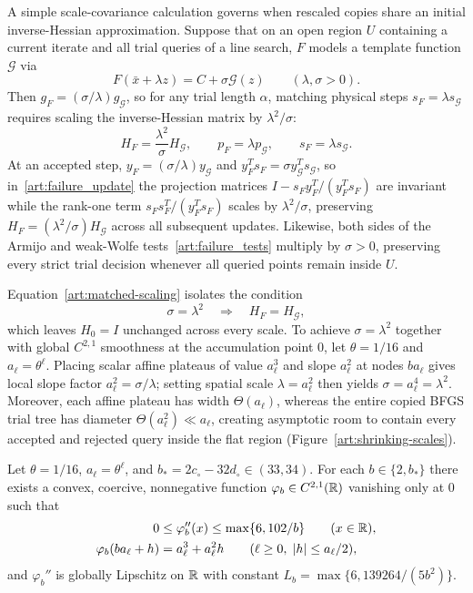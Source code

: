 A simple scale-covariance calculation governs when rescaled copies share an
initial inverse-Hessian approximation. Suppose that on an open region $U$
containing a current iterate and all trial queries of a line search, $F$ models
a template function $\mathcal G$ via
\begin{equation}\label{art:matched-local-model}
 F(\bar x+\lambda z)=C+\sigma\mathcal G(z)\qquad(\lambda,\sigma>0).
\end{equation}
Then $g_F=(\sigma/\lambda)g_{\mathcal G}$, so for any trial length $\alpha$,
matching physical steps $s_F=\lambda s_{\mathcal G}$ requires scaling the
inverse-Hessian matrix by $\lambda^2/\sigma$:
\begin{equation}\label{art:matched-scaling}
 H_F=\frac{\lambda^2}{\sigma}H_{\mathcal G},\qquad
 p_F=\lambda p_{\mathcal G},\qquad s_F=\lambda s_{\mathcal G}.
\end{equation}
At an accepted step, $y_F=(\sigma/\lambda)y_{\mathcal G}$ and
$y_F^Ts_F=\sigma y_{\mathcal G}^Ts_{\mathcal G}$, so in~\eqref{art:failure_update}
the projection matrices $I-s_Fy_F^T/(y_F^Ts_F)$ are invariant while the rank-one
term $s_Fs_F^T/(y_F^Ts_F)$ scales by $\lambda^2/\sigma$, preserving
$H_F=(\lambda^2/\sigma)H_{\mathcal G}$ across all subsequent updates. Likewise,
both sides of the Armijo and weak-Wolfe tests~\eqref{art:failure_tests} multiply
by $\sigma>0$, preserving every strict trial decision whenever all queried
points remain inside $U$.

Equation~\eqref{art:matched-scaling} isolates the condition
\[
 \sigma=\lambda^2\quad\Longrightarrow\quad H_F=H_{\mathcal G},
\]
which leaves $H_0=I$ unchanged across every scale. To achieve $\sigma=\lambda^2$
together with global $C^{2,1}$ smoothness at the accumulation point $0$, let
$\theta=1/16$ and $a_\ell=\theta^\ell$. Placing scalar affine plateaus of value
$a_\ell^3$ and slope $a_\ell^2$ at nodes $ba_\ell$ gives local slope factor
$a_\ell^2=\sigma/\lambda$; setting spatial scale $\lambda=a_\ell^2$ then yields
$\sigma=a_\ell^4=\lambda^2$. Moreover, each affine plateau has width
$\Theta(a_\ell)$, whereas the entire copied BFGS trial tree has diameter
$\Theta(a_\ell^2)\ll a_\ell$, creating asymptotic room to contain every accepted
and rejected query inside the flat region (Figure~\ref{art:shrinking-scales}).

\begin{lemma}\label{art:upper_scalar_lemma}
Let $\theta=1/16$, $a_\ell=\theta^\ell$, and $b_*=2c_\circ-32d_\circ\in(33,34)$.
For each $b\in\{2,b_*\}$ there exists a convex, coercive, nonnegative function
$\varphi_b\in C^{2,1}(\mathbb R)$ vanishing only at $0$ such that
\begin{align}
 0&\le\varphi_b''(x)\le\max\{6,102/b\}\qquad(x\in\mathbb R),\label{art:scalar_curvature}\\
 \varphi_b(ba_\ell+h)&=a_\ell^3+a_\ell^2h
       \qquad(\ell\ge0,\;|h|\le a_\ell/2),\label{art:scalar_plateau}
\end{align}
and $\varphi_b''$ is globally Lipschitz on $\mathbb R$ with constant
$L_b=\max\{6,139264/(5b^2)\}$.
\end{lemma}

